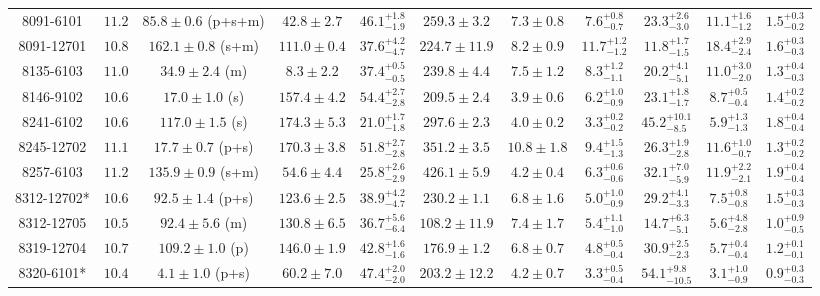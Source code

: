 \begin{landscape}
\begin{longtable}{ccccccccccc}
8091-6101 & $11.2$  & $85.8 \pm 0.6$ (p+s+m)  & $42.8 \pm 2.7$ & $46.1^{+1.8}_{-1.9}$  & $259.3 \pm 3.2 $ & $7.3 \pm 0.8 $ & $7.6^{+0.8}_{-0.7}$  & $23.3^{+2.6}_{-3.0}$  & $11.1^{+1.6}_{-1.2}$  & $1.5^{+0.3}_{-0.2}$ \\ 
8091-12701 & $10.8$  & $162.1 \pm 0.8$ (s+m)  & $111.0 \pm 0.4$ & $37.6^{+4.2}_{-4.7}$  & $224.7 \pm 11.9 $ & $8.2 \pm 0.9 $ & $11.7^{+1.2}_{-1.2}$  & $11.8^{+1.7}_{-1.5}$  & $18.4^{+2.9}_{-2.4}$  & $1.6^{+0.3}_{-0.3}$ \\ 
8135-6103 & $11.0$  & $34.9 \pm 2.4$ (m)  & $8.3 \pm 2.2$ & $37.4^{+0.5}_{-0.5}$  & $239.8 \pm 4.4 $ & $7.5 \pm 1.2 $ & $8.3^{+1.2}_{-1.1}$  & $20.2^{+4.1}_{-5.1}$  & $11.0^{+3.0}_{-2.0}$  & $1.3^{+0.4}_{-0.3}$ \\ 
8146-9102 & $10.6$  & $17.0 \pm 1.0$ (s)  & $157.4 \pm 4.2$ & $54.4^{+2.7}_{-2.8}$  & $209.5 \pm 2.4 $ & $3.9 \pm 0.6 $ & $6.2^{+1.0}_{-0.9}$  & $23.1^{+1.8}_{-1.7}$  & $8.7^{+0.5}_{-0.4}$  & $1.4^{+0.2}_{-0.2}$ \\ 
8241-6102 & $10.6$  & $117.0 \pm 1.5$ (s)  & $174.3 \pm 5.3$ & $21.0^{+1.7}_{-1.8}$  & $297.6 \pm 2.3 $ & $4.0 \pm 0.2 $ & $3.3^{+0.2}_{-0.2}$  & $45.2^{+10.1}_{-8.5}$  & $5.9^{+1.3}_{-1.3}$  & $1.8^{+0.4}_{-0.4}$ \\ 
8245-12702 & $11.1$  & $17.7 \pm 0.7$ (p+s)  & $170.3 \pm 3.8$ & $51.8^{+2.7}_{-2.8}$  & $351.2 \pm 3.5 $ & $10.8 \pm 1.8 $ & $9.4^{+1.5}_{-1.3}$  & $26.3^{+1.9}_{-2.8}$  & $11.6^{+1.0}_{-0.7}$  & $1.3^{+0.2}_{-0.2}$ \\ 
8257-6103 & $11.2$  & $135.9 \pm 0.9$ (s+m)  & $54.6 \pm 4.4$ & $25.8^{+2.6}_{-2.9}$  & $426.1 \pm 5.9 $ & $4.2 \pm 0.4 $ & $6.3^{+0.6}_{-0.6}$  & $32.1^{+7.0}_{-5.9}$  & $11.9^{+2.2}_{-2.1}$  & $1.9^{+0.4}_{-0.4}$ \\ 
8312-12702* & $10.6$  & $92.5 \pm 1.4$ (p+s)  & $123.6 \pm 2.5$ & $38.9^{+4.2}_{-4.7}$  & $230.2 \pm 1.1 $ & $6.8 \pm 1.6 $ & $5.0^{+1.0}_{-0.9}$  & $29.2^{+4.1}_{-3.3}$  & $7.5^{+0.8}_{-0.8}$  & $1.5^{+0.3}_{-0.3}$ \\ 
8312-12705 & $10.5$  & $92.4 \pm 5.6$ (m)  & $130.8 \pm 6.5$ & $36.7^{+5.6}_{-6.4}$  & $108.2 \pm 11.9 $ & $7.4 \pm 1.7 $ & $5.4^{+1.1}_{-1.0}$  & $14.7^{+6.3}_{-5.1}$  & $5.6^{+4.8}_{-2.8}$  & $1.0^{+0.9}_{-0.5}$ \\ 
8319-12704 & $10.7$  & $109.2 \pm 1.0$ (p)  & $146.0 \pm 1.9$ & $42.8^{+1.6}_{-1.6}$  & $176.9 \pm 1.2 $ & $6.8 \pm 0.7 $ & $4.8^{+0.5}_{-0.4}$  & $30.9^{+2.5}_{-2.3}$  & $5.7^{+0.4}_{-0.4}$  & $1.2^{+0.1}_{-0.1}$ \\ 
8320-6101* & $10.4$  & $4.1 \pm 1.0$ (p+s)  & $60.2 \pm 7.0$ & $47.4^{+2.0}_{-2.0}$  & $203.2 \pm 12.2 $ & $4.2 \pm 0.7 $ & $3.3^{+0.5}_{-0.4}$  & $54.1^{+9.8}_{-10.5}$  & $3.1^{+1.0}_{-0.9}$  & $0.9^{+0.3}_{-0.3}$ \\ 

\end{longtable}
\end{landscape}
